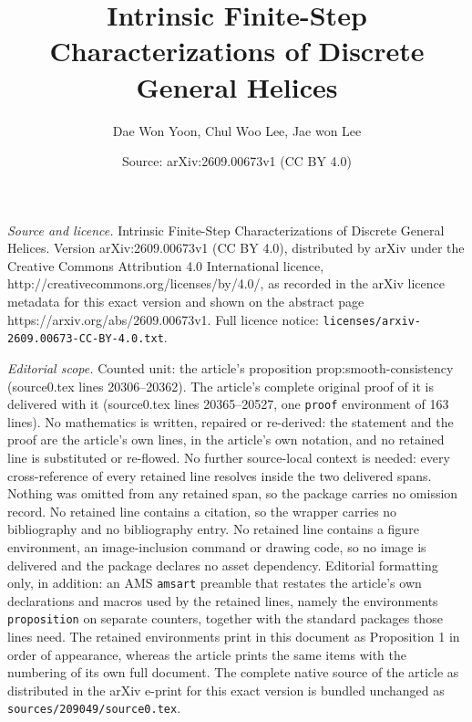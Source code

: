 \documentclass[10pt,a4paper]{amsart}
\title{Intrinsic Finite-Step Characterizations of Discrete General Helices}
\author{Dae Won Yoon, Chul Woo Lee, Jae won Lee}
\date{Source: arXiv:2609.00673v1 (CC BY 4.0)}
\begin{document}
\maketitle

\noindent\emph{Source and licence.} Intrinsic Finite-Step Characterizations of Discrete General Helices. Version arXiv:2609.00673v1 (CC BY 4.0), distributed by arXiv under the Creative Commons Attribution 4.0 International licence, http://creativecommons.org/licenses/by/4.0/, as recorded in the arXiv licence metadata for this exact version and shown on the abstract page https://arxiv.org/abs/2609.00673v1. Full licence notice: \texttt{licenses/arxiv-2609.00673-CC-BY-4.0.txt}.\par\smallskip

\noindent\textit{Editorial scope.} Counted unit: the article's proposition prop:smooth-consistency (source0.tex lines 20306--20362). The article's complete original proof of it is delivered with it (source0.tex lines 20365--20527, one \texttt{proof} environment of 163 lines). No mathematics is written, repaired or re-derived: the statement and the proof are the article's own lines, in the article's own notation, and no retained line is substituted or re-flowed.  No further source-local context is needed: every cross-reference of every retained line resolves inside the two delivered spans.  Nothing was omitted from any retained span, so the package carries no omission record.  No retained line contains a citation, so the wrapper carries no bibliography and no bibliography entry.  No retained line contains a figure environment, an image-inclusion command or drawing code, so no image is delivered and the package declares no asset dependency.  Editorial formatting only, in addition: an AMS \texttt{amsart} preamble that restates the article's own declarations and macros used by the retained lines, namely the environments \texttt{proposition} on separate counters, together with the standard packages those lines need.  The retained environments print in this document as Proposition 1 in order of appearance, whereas the article prints the same items with the numbering of its own full document.  The complete native source of the article as distributed in the arXiv e-print for this exact version is bundled unchanged as \texttt{sources/209049/source0.tex}.
\end{document}
